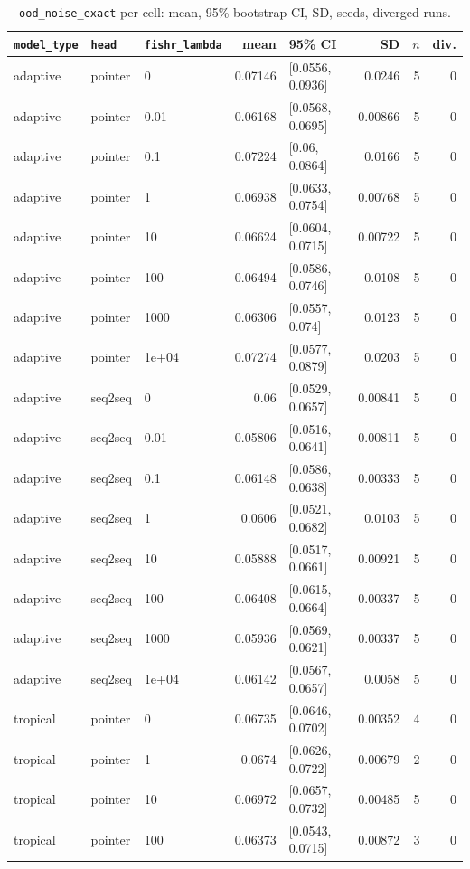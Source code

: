 \documentclass[10pt]{article}
\begin{document}
{\small
\begin{longtable}{lllrlrrr}
\caption{\texttt{ood\_noise\_exact} per cell: mean, 95\% bootstrap CI, SD, seeds, diverged runs.}\label{tab:summary-ood_noise_exact}\\
\toprule
\texttt{model\_type} & \texttt{head} & \texttt{fishr\_lambda} & mean & 95\% CI & SD & $n$ & div.\\
\midrule
\endhead
adaptive & pointer & 0 & 0.07146 & [0.0556, 0.0936] & 0.0246 & 5 & 0\\
adaptive & pointer & 0.01 & 0.06168 & [0.0568, 0.0695] & 0.00866 & 5 & 0\\
adaptive & pointer & 0.1 & 0.07224 & [0.06, 0.0864] & 0.0166 & 5 & 0\\
adaptive & pointer & 1 & 0.06938 & [0.0633, 0.0754] & 0.00768 & 5 & 0\\
adaptive & pointer & 10 & 0.06624 & [0.0604, 0.0715] & 0.00722 & 5 & 0\\
adaptive & pointer & 100 & 0.06494 & [0.0586, 0.0746] & 0.0108 & 5 & 0\\
adaptive & pointer & 1000 & 0.06306 & [0.0557, 0.074] & 0.0123 & 5 & 0\\
adaptive & pointer & 1e+04 & 0.07274 & [0.0577, 0.0879] & 0.0203 & 5 & 0\\
adaptive & seq2seq & 0 & 0.06 & [0.0529, 0.0657] & 0.00841 & 5 & 0\\
adaptive & seq2seq & 0.01 & 0.05806 & [0.0516, 0.0641] & 0.00811 & 5 & 0\\
adaptive & seq2seq & 0.1 & 0.06148 & [0.0586, 0.0638] & 0.00333 & 5 & 0\\
adaptive & seq2seq & 1 & 0.0606 & [0.0521, 0.0682] & 0.0103 & 5 & 0\\
adaptive & seq2seq & 10 & 0.05888 & [0.0517, 0.0661] & 0.00921 & 5 & 0\\
adaptive & seq2seq & 100 & 0.06408 & [0.0615, 0.0664] & 0.00337 & 5 & 0\\
adaptive & seq2seq & 1000 & 0.05936 & [0.0569, 0.0621] & 0.00337 & 5 & 0\\
adaptive & seq2seq & 1e+04 & 0.06142 & [0.0567, 0.0657] & 0.0058 & 5 & 0\\
tropical & pointer & 0 & 0.06735 & [0.0646, 0.0702] & 0.00352 & 4 & 0\\
tropical & pointer & 1 & 0.0674 & [0.0626, 0.0722] & 0.00679 & 2 & 0\\
tropical & pointer & 10 & 0.06972 & [0.0657, 0.0732] & 0.00485 & 5 & 0\\
tropical & pointer & 100 & 0.06373 & [0.0543, 0.0715] & 0.00872 & 3 & 0\\

\end{longtable}}
\end{document}
